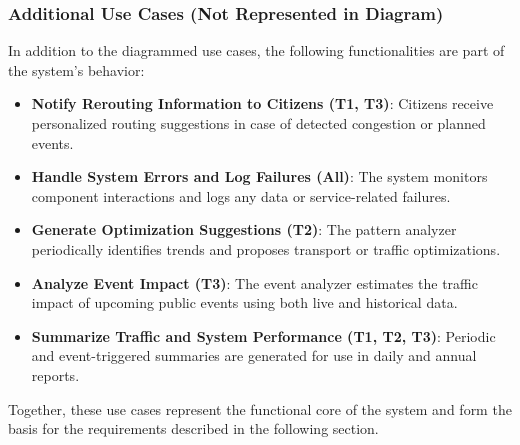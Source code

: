 \subsubsection*{Additional Use Cases (Not Represented in Diagram)}

In addition to the diagrammed use cases, the following functionalities are part of the system's behavior:

\begin{itemize}
    \item \textbf{Notify Rerouting Information to Citizens (T1, T3)}: Citizens receive personalized routing suggestions in case of detected congestion or planned events.

    \item \textbf{Handle System Errors and Log Failures (All)}: The system monitors component interactions and logs any data or service-related failures.

    \item \textbf{Generate Optimization Suggestions (T2)}: The pattern analyzer periodically identifies trends and proposes transport or traffic optimizations.

    \item \textbf{Analyze Event Impact (T3)}: The event analyzer estimates the traffic impact of upcoming public events using both live and historical data.

    \item \textbf{Summarize Traffic and System Performance (T1, T2, T3)}: Periodic and event-triggered summaries are generated for use in daily and annual reports.
\end{itemize}

Together, these use cases represent the functional core of the system and form the basis for the requirements described in the following section.



\newpage

